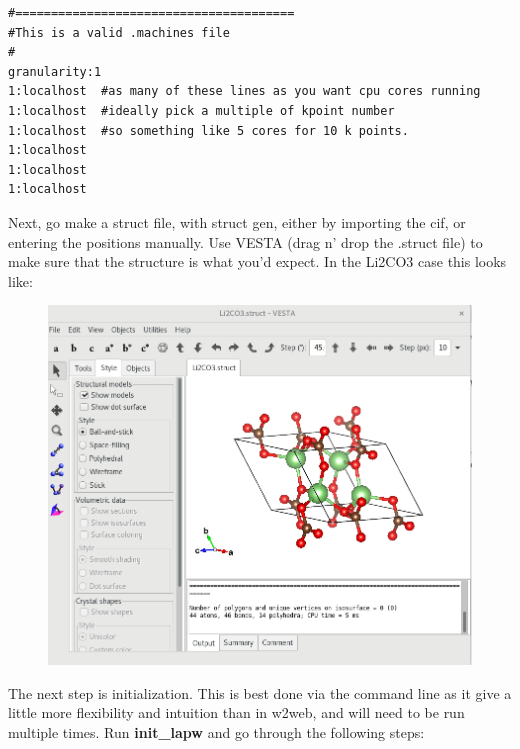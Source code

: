 \documentclass[12pt]{article}
\begin{document}
\begin{lstlisting}
#=======================================
#This is a valid .machines file
#
granularity:1
1:localhost  #as many of these lines as you want cpu cores running
1:localhost  #ideally pick a multiple of kpoint number 
1:localhost  #so something like 5 cores for 10 k points.
1:localhost
1:localhost
1:localhost

\end{lstlisting}

Next, go make a struct file, with struct gen, either by importing the cif, or entering the positions manually.  Use VESTA (drag n' drop the .struct file) to make sure that the structure is what you'd expect. 
In the Li2CO3 case this looks like: 

	\begin{figure}[H]
	\includegraphics[scale=0.4]{./images/Li2CO3_struct.png}
\end{figure}


The next step is initialization.  This is best done via the command line as it give a little more flexibility and intuition than in w2web, and will need to be run multiple times.  Run \textbf{init\_lapw} and go through the following steps:
\end{document}
